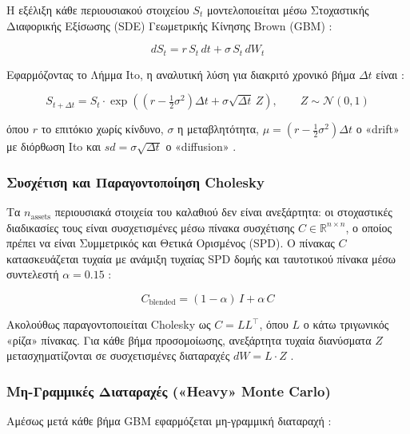 Η εξέλιξη κάθε περιουσιακού στοιχείου $S_t$ μοντελοποιείται μέσω Στοχαστικής Διαφορικής Εξίσωσης (SDE) Γεωμετρικής Κίνησης Brown (GBM) \cite{GilesMC}:

\begin{equation}
  dS_t = r\,S_t\,dt + \sigma\,S_t\,dW_t
\end{equation}

Εφαρμόζοντας το Λήμμα Ito, η αναλυτική λύση για διακριτό χρονικό βήμα $\Delta t$ είναι \cite{GilesMC}:

\begin{equation}
  S_{t+\Delta t} = S_t \cdot
    \exp\!\left(\left(r - \tfrac{1}{2}\sigma^2\right)\Delta t
                + \sigma\sqrt{\Delta t}\,Z\right),
  \qquad Z \sim \mathcal{N}(0,1)
\end{equation}

όπου $r$ το επιτόκιο χωρίς κίνδυνο, $\sigma$ η μεταβλητότητα, $\mu = (r - \frac{1}{2}\sigma^2)\Delta t$ ο «drift» με διόρθωση Ito και $sd = \sigma\sqrt{\Delta t}$ ο «diffusion» \cite{appcode}.

\subsubsection{Συσχέτιση και Παραγοντοποίηση Cholesky}

Τα $n_\mathrm{assets}$ περιουσιακά στοιχεία του καλαθιού δεν είναι ανεξάρτητα: οι στοχαστικές διαδικασίες τους είναι συσχετισμένες μέσω πίνακα συσχέτισης $C \in \mathbb{R}^{n\times n}$, ο οποίος πρέπει να είναι Συμμετρικός και Θετικά Ορισμένος (SPD). Ο πίνακας $C$ κατασκευάζεται τυχαία με ανάμιξη τυχαίας SPD δομής και ταυτοτικού πίνακα μέσω συντελεστή $\alpha=0.15$ \cite{GoddardMC,GilesMC,appcode}:

\begin{equation}
  C_\mathrm{blended} = (1-\alpha)\,I + \alpha\,C
\end{equation}

Ακολούθως παραγοντοποιείται Cholesky ως $C = LL^\top$, όπου $L$ ο κάτω τριγωνικός «ρίζα» πίνακας. Για κάθε βήμα προσομοίωσης, ανεξάρτητα τυχαία διανύσματα $Z$ μετασχηματίζονται σε συσχετισμένες διαταραχές $dW = L \cdot Z$ \cite{GoddardMC,GilesMC,appcode}.

\subsubsection{Μη-Γραμμικές Διαταραχές («Heavy» Monte Carlo)}

Αμέσως μετά κάθε βήμα GBM εφαρμόζεται μη-γραμμική διαταραχή \cite{appcode}:

